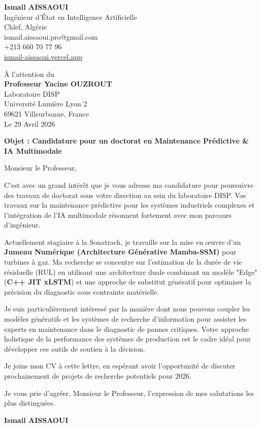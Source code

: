 \documentclass[a4paper,12pt]{article}
\begin{document}
\begin{flushleft}
    \textbf{Ismail AISSAOUI} \\
    Ingénieur d'État en Intelligence Artificielle \\
    Chlef, Algérie \\
    ismail.aissaoui.pro@gmail.com \\
    +213 660 70 77 96 \\
    \href{https://ismail-aissaoui.vercel.app}{ismail-aissaoui.vercel.app}
\end{flushleft}

\begin{flushright}
    À l'attention du \\
    \textbf{Professeur Yacine OUZROUT} \\
    Laboratoire DISP \\
    Université Lumière Lyon 2 \\
    69621 Villeurbanne, France \\
    \medskip
    Le 29 Avril 2026
\end{flushright}

\bigskip

\noindent \textbf{Objet : Candidature pour un doctorat en Maintenance Prédictive \& IA Multimodale}

\bigskip

Monsieur le Professeur,

C'est avec un grand intérêt que je vous adresse ma candidature pour poursuivre des travaux de doctorat sous votre direction au sein du laboratoire DISP. Vos travaux sur la maintenance prédictive pour les systèmes industriels complexes et l'intégration de l'IA multimodale résonnent fortement avec mon parcours d'ingénieur.

Actuellement stagiaire à la Sonatrach, je travaille sur la mise en œuvre d'un \textbf{Jumeau Numérique (Architecture Générative Mamba-SSM)} pour turbines à gaz. Ma recherche se concentre sur l'estimation de la durée de vie résiduelle (RUL) en utilisant une architecture duale combinant un modèle "Edge" (\textbf{C++ JIT xLSTM}) et une approche de substitut génératif pour optimiser la précision du diagnostic sous contrainte matérielle.

Je suis particulièrement intéressé par la manière dont nous pouvons coupler les modèles génératifs et les systèmes de recherche d'information pour assister les experts en maintenance dans le diagnostic de pannes critiques. Votre approche holistique de la performance des systèmes de production est le cadre idéal pour développer ces outils de soutien à la décision.

Je joins mon CV à cette lettre, en espérant avoir l'opportunité de discuter prochainement de projets de recherche potentiels pour 2026.

Je vous prie d'agréer, Monsieur le Professeur, l'expression de mes salutations les plus distinguées.

\bigskip

\begin{flushright}
    \textbf{Ismail AISSAOUI}
\end{flushright}
\end{document}
